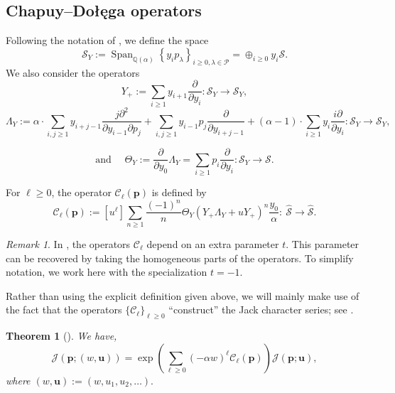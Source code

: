 \documentclass[12pt]{amsart}
\newtheorem{thm}{Theorem}[section]
\theoremstyle{remark}
\newtheorem{remark}{Remark}
\newcommand{\bfp}{\boldsymbol{p}}
\newcommand{\bfu}{\boldsymbol{u}}
\newcommand{\C}{\mathcal C}
\newcommand{\QQ}{\mathbb Q}
\DeclareMathOperator{\Span}{\text{Span}}
\newcommand{\YY}{\mathcal{P}}
\newcommand{\mcS}{\mathcal{S}}
\newcommand{\mcSh}{\widehat{\mathcal{S}}}
\begin{document}
\subsection{Chapuy--Do\l{}e\k{}ga operators}\label{ssec:CD}
Following the notation of \cite{ChapuyDolega2022}, we define the space 
$$\mcS_Y:=\Span_{\QQ(\alpha)}\left\{y_i p_\lambda\right\}_{i\geq 0,\lambda \in\YY}=\mathop{\oplus}_{i\geq 0}y_i\mcS.$$
 We also consider the operators
\begin{equation*}
Y_+:=\sum_{i\geq 1}y_{i+1}\frac{\partial}{\partial y_i}: \mcS_Y\rightarrow\mcS_Y,
\end{equation*}
\begin{equation*}
\Lambda_Y:=\alpha\cdot\sum_{i,j\geq1}y_{i+j-1}\frac{j\partial^2}{\partial y_{i-1}\partial p_{j}}+\sum_{i,j\geq1} y_{i-1}p_j\frac{\partial}{\partial y_{i+j-1}} +(\alpha-1)\cdot \sum_{i\geq1}y_{i}\frac{i\partial}{\partial y_i}: \mcS_Y\rightarrow\mcS_Y,
\end{equation*}

$$\text{and }\quad \Theta_Y:=\frac{\partial}{\partial y_0}\Lambda_Y=\sum_{i\geq1}p_i\frac{\partial}{\partial y_i}: \mcS_Y\rightarrow\mcS.$$



For $\ell\geq 0$, the operator $\C_{\ell}(\bfp)$ is defined by 
\begin{equation}\label{eq:pos_Cl}
  \C_\ell(\bfp):=[u^\ell]\sum_{n\geq 1}\frac{(-1)^n}{n}\Theta_Y\left(Y_+\Lambda_Y+u Y_+\right)^{n}\frac{y_0}{\alpha}:\ \mcSh\rightarrow\mcSh.  
\end{equation}


\begin{remark}
    In \cite{BenDaliDolega2023,BenDali2025}, the operators $\C_\ell$ depend on an extra parameter $t$. This parameter can be recovered by taking the homogeneous parts of the operators. To simplify notation, we work here with the specialization $t=-1$. 
\end{remark}
Rather than using the explicit definition given above, we will mainly make use of  the fact that the operators $\{\C_\ell\}_{\ell\geq0}$ ``construct'' the Jack character series; see \cite[Eqs.~(28) and (65)]{BenDaliDolega2023}.
\begin{thm}[\cite{BenDaliDolega2023}]\label{thm:BDD}
    We have,
    \begin{equation}
        \mathcal{J}(\bfp;(w,\bfu))=\exp\left(\sum_{\ell\geq 0}(-\alpha w)^\ell\C_\ell(\bfp)\right)\mathcal{J}(\bfp;\bfu),
    \end{equation}
    where $(w,\bfu):=(w,u_1,u_2,\dots).$
\end{thm}
\end{document}
